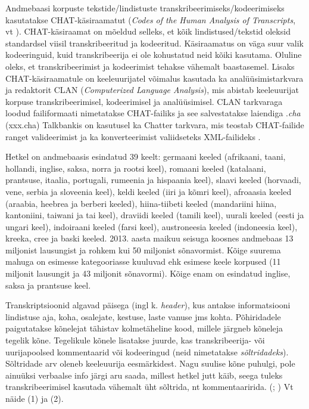 \documentclass[12pt]{article}
\begin{document}
Andmebaasi korpuste tekstide/lindistuste transkribeerimiseks/kodeerimiseks kasutatakse CHAT-käsiraamatut (\emph{Codes of the Human Analysis of Transcripts}, vt \citep{CHAT}). CHAT-käsiraamat on mõeldud selleks, et kõik lindistused/tekstid oleksid standardsel viisil transkribeeritud ja kodeeritud. Käsiraamatus on väga suur valik kodeeringuid, kuid transkribeerija ei ole kohustatud neid kõiki kasutama. Oluline oleks, et transkribeerimist ja kodeerimist tehakse vähemalt baastasemel. Lisaks CHAT-käsiraamatule on keeleuurijatel võimalus kasutada ka analüüsimistarkvara ja redaktorit CLAN (\emph{Computerized Language Analysis}), mis abistab keeleuurijat korpuse transkribeerimisel, kodeerimisel ja analüüsimisel. CLAN tarkvaraga loodud failiformaati nimetatakse CHAT-failiks ja see salvestatakse laiendiga .\emph{cha} (xxx.cha) \citep[1--2, 6]{Gillis} Talkbankis on kasutusel ka Chatter tarkvara, mis teostab CHAT-failide ranget valideerimist ja ka konverteerimist valiidseteks XML-failideks \citep{CHATTER}.

Hetkel on andmebaasis esindatud 39 keelt: germaani keeled (afrikaani, taani, hollandi, inglise, saksa, norra ja rootsi keel), romaani keeled (katalaani, prantsuse, itaalia, portugali, rumeenia ja hispaania keel), slaavi keeled (horvaadi, vene, serbia ja sloveenia keel), keldi keeled (iiri ja kõmri keel), afroaasia keeled (araabia, heebrea ja berberi keeled), hiina-tiibeti keeled (mandariini hiina, kantoniini, taiwani ja tai keel), draviidi keeled (tamili keel), uurali keeled (eesti ja ungari keel), indoiraani keeled (farsi keel), austroneesia keeled (indoneesia keel), kreeka, cree ja baski keeled. 2013. aasta maikuu seisuga koosnes andmebaas 13 miljonist lausungist ja rohkem kui 50 miljonist sõnavormist. Kõige suurema mahuga on esimesse kategooriasse kuuluvad ehk esimese keele korpused (11 miljonit lausungit ja 43 miljonit sõnavormi). Kõige enam on esindatud inglise, saksa ja prantsuse keel.\citep[2--5]{Gillis}

Transkriptsioonid algavad päisega (ingl k. \emph{header}), kus antakse informatsiooni lindistuse aja, koha, osalejate, kestuse, laste vanuse jms kohta. Põhiridadele paigutatakse kõnelejat tähistav kolmetäheline kood, millele järgneb  kõneleja tegelik kõne. Tegelikule kõnele lisatakse juurde, kas transkribeerija- või uurijapoolsed kommentaarid või kodeeringud (neid nimetatakse \emph{sõltridadeks}). Sõltridade arv oleneb keeleuurija eesmärkidest. Nagu suulise kõne puhulgi, pole ainuüksi verbaalse info järgi aru saada, millest hetkel jutt käib, seega tuleks transkribeerimisel kasutada vähemalt üht sõltrida, nt kommentaaririda. (\citealp[68]{Argus2007}; \citealp{CHAT}) Vt näide (1) ja (2).
\hfill
\end{document}
